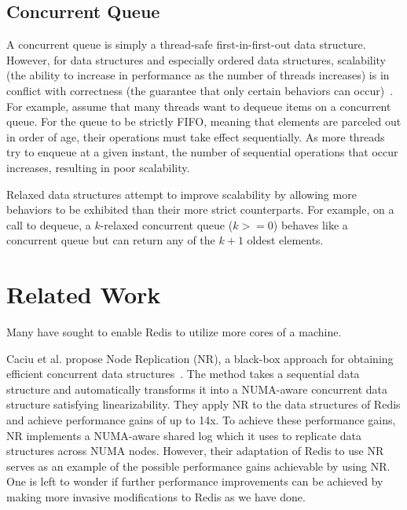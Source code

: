 \documentclass[sigconf, screen]{acmart}
\begin{document}
\subsection{Concurrent Queue}
A concurrent queue is simply a thread-safe first-in-first-out data structure.
However, for data structures and especially ordered data structures, scalability (the ability to increase in performance as the number of threads increases) is in conflict with correctness (the guarantee that only certain behaviors can occur)~\cite{10.1145/1926385.1926442}.
For example, assume that many threads want to dequeue items on a concurrent queue. For the queue to be strictly FIFO, meaning that elements are parceled out in order of age, their operations must take effect sequentially.
As more threads try to enqueue at a given instant, the number of sequential operations that occur increases, resulting in poor scalability.

Relaxed data structures attempt to improve scalability by allowing more behaviors to be exhibited than their more strict counterparts.
For example, on a call to dequeue, a $k$-relaxed concurrent queue ($k >= 0$) behaves like a concurrent queue but can return any of the $k + 1$ oldest elements.

\section{Related Work}
Many have sought to enable Redis to utilize more cores of a machine.

Caciu et al. propose Node Replication (NR), a black-box approach for obtaining efficient concurrent data structures~\cite{10.1145/3037697.3037721}.
The method takes a sequential data structure and automatically transforms it into a NUMA-aware concurrent data structure satisfying linearizability.
They apply NR to the data structures of Redis and achieve performance gains of up to 14x.
To achieve these performance gains, NR implements a NUMA-aware shared log which it uses to replicate data structures across NUMA nodes.
However, their adaptation of Redis to use NR serves as an example of the possible performance gains achievable by using NR.
One is left to wonder if further performance improvements can be achieved by making more invasive modifications to Redis as we have done.

\end{document}

